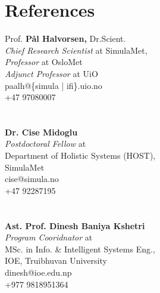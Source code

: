 \documentclass{resume}
\begin{document}
\section{References}
\begin{center}

\begin{multicols}{3}
Prof. \textbf{Pål Halvorsen,} Dr.Scient. \\
\small{\textit{Chief Research Scientist}} at SimulaMet,\\
\textit{Professor} at OsloMet \\
\textit{Adjunct Professor }at UiO\\
paalh@\{simula | ifi\}.uio.no \\
+47 97080007  \\~\\~\\


\textbf{Dr. Cise Midoglu} \\
\textit{Postdoctoral Fellow }at \\
\small{Department of Holistic Systems (HOST)}, \\
SimulaMet \\
cise@simula.no \\
+47 92287195   \\~\\~\\

\textbf{Ast. Prof. Dinesh Baniya Kshetri} \\
\textit{Program Cooridnator }at \\
\small{MSc. in Info. \& Intelligent Systems Eng.}, \\
IOE, Truibhuvan University \\
dinesh@ioe.edu.np \\
+977 9818951364 \\~\\~\\

\end{multicols}
    
\end{center}

\par\vfill\hfill{} 
\clearpage
% 
\end{document}

